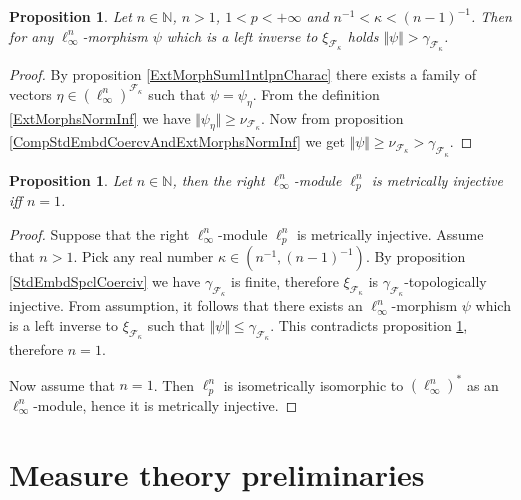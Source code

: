 \documentclass[12pt]{article}
\newtheorem{proposition}[theorem]{Proposition}
\begin{document}
\begin{proposition}\label{RetrPrblmNoSln}
    Let $n\in\mathbb{N}$, $n>1$, $1<p<+\infty$ and $n^{-1}<\kappa<(n-1)^{-1}$. 
    Then for any $\ell_{\infty}^n$-morphism $\psi$ which is a left inverse 
    to $\xi_{\mathcal{F}_{\kappa}}$ 
    holds $\Vert \psi\Vert>\gamma_{\mathcal{F}_{\kappa}}$.  
\end{proposition}
\begin{proof}
    By proposition \ref{ExtMorphSuml1ntlpnCharac} there exists a family of 
    vectors $\eta\in(\ell_{\infty}^n)^{\mathcal{F}_{\kappa}}$ such 
    that $\psi=\psi_{\eta}$. From the definition \ref{ExtMorphsNormInf} we 
    have $\Vert \psi_{\eta}\Vert\geq \nu_{\mathcal{F}_{\kappa}}$. Now from 
    proposition \ref{CompStdEmbdCoercvAndExtMorphsNormInf} we 
    get 
    $
    \Vert\psi\Vert\geq\nu_{\mathcal{F}_{\kappa}}>\gamma_{\mathcal{F}_{\kappa}}.
    $
\end{proof}

\begin{proposition}\label{linftnModlpnIsntMetInjCharac}
    Let $n\in\mathbb{N}$, then the right $\ell_{\infty}^n$-module $\ell_p^n$ is 
    metrically injective iff $n=1$.
\end{proposition}
\begin{proof}
    Suppose that the right $\ell_{\infty}^n$-module $\ell_p^n$ is metrically 
    injective. Assume that $n>1$. Pick any real 
    number $\kappa\in(n^{-1},(n-1)^{-1})$. By 
    proposition \ref{StdEmbdSpclCoerciv} we 
    have $\gamma_{\mathcal{F}_{\kappa}}$ is finite, 
    therefore $\xi_{\mathcal{F}_{\kappa}}$ 
    is $\gamma_{\mathcal{F}_{\kappa}}$-topologically injective. 
    From assumption, it follows that there exists 
    an $\ell_{\infty}^n$-morphism $\psi$ which is a left inverse 
    to $\xi_{\mathcal{F}_{\kappa}}$ such 
    that $\Vert\psi\Vert\leq \gamma_{\mathcal{F}_{\kappa}}$. 
    This contradicts proposition \ref{linftnModlpnIsntMetInjCharac}, 
    therefore $n=1$.

    Now assume that $n=1$. Then $\ell_p^n$ is isometrically isomorphic 
    to $(\ell_\infty^n)^*$ as an $\ell_{\infty}^n$-module, hence it is
    metrically injective.
\end{proof}


\section{Measure theory preliminaries}
\label{MeasThPrelim}
\end{document}
